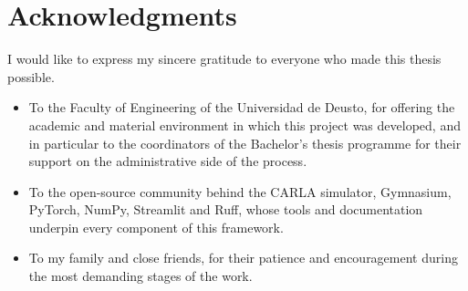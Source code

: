 
\chapter*{Acknowledgments}

I would like to express my sincere gratitude to everyone who made this thesis possible.

\begin{itemize}
  \item To the Faculty of Engineering of the Universidad de Deusto, for offering the academic and
        material environment in which this project was developed, and in particular to the
        coordinators of the Bachelor's thesis programme for their support on the administrative
        side of the process.
  \item To the open-source community behind the CARLA simulator, Gymnasium, PyTorch, NumPy,
        Streamlit and Ruff, whose tools and documentation underpin every component of this
        framework.
  \item To my family and close friends, for their patience and encouragement during the most
        demanding stages of the work.
\end{itemize}
